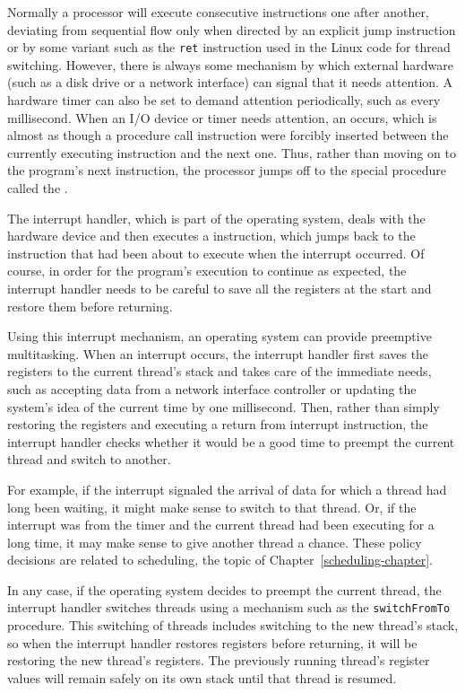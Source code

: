 Normally a processor will execute consecutive instructions one after
another, deviating from sequential flow only when directed by an
explicit jump instruction or by some variant such as the \verb|ret|
instruction used in the Linux code for thread switching.
However, there is always some mechanism by which external hardware
(such as a disk drive or a network interface) can signal that it needs
attention.
A hardware timer can also be set to demand attention periodically,
such as every millisecond.
When an I/O device or timer needs attention, an  occurs, which is almost as
though a procedure call instruction were forcibly inserted between the
currently executing instruction and the next one.  Thus, rather than
moving on to the program's next instruction, the processor jumps off
to the special procedure called the .

The interrupt handler, which is part of the operating
system, deals with the hardware device and then executes a  instruction, which jumps back to the instruction that
had been about to execute when the interrupt occurred.  Of course, in
order for the program's execution to continue as expected, the
interrupt handler needs to be careful to save all the registers at the
start and restore them before returning.

Using this interrupt mechanism, an operating system can provide
preemptive multitasking.  When an interrupt occurs, the interrupt
handler first
saves the registers to the current thread's stack and
takes care of the immediate needs, such as
accepting data from a network interface controller or updating the
system's idea of the current time by one millisecond.  Then,
rather than simply restoring the registers and executing a return from
interrupt instruction, the interrupt handler checks whether it would
be a good time to preempt the current thread and switch to another.

For example, if the interrupt signaled the arrival of data for which a
thread had long been waiting, it might make sense to switch to
that thread.  Or, if the interrupt was from the timer and the current
thread had been executing for a long time, it may make sense to give
another thread a chance.  These policy decisions are related to
scheduling, the topic of Chapter~\ref{scheduling-chapter}.

In any case, if the
operating system decides to preempt the current thread, the interrupt
handler switches threads using a
mechanism such as the \verb|switchFromTo| procedure.
This switching of threads includes switching to the new thread's stack,
so when the interrupt handler restores registers before returning,
it will be restoring the new thread's registers. The previously running
thread's register values will remain safely on its own stack until that
thread is resumed.

